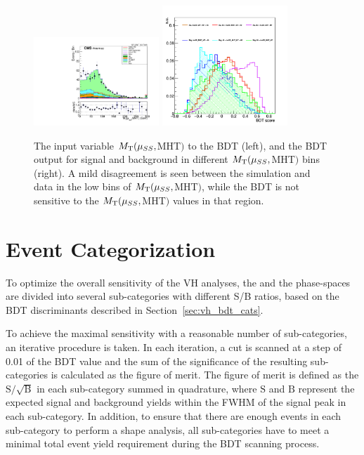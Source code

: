 \begin{figure}[!htb]
  \centering
  \captionsetup{justification=justified}
  \includegraphics[width=0.42\textwidth]{pics/VH_sec/valid_BDT_WH/muSS_MHT_MT.pdf}
  \includegraphics[width=0.42\textwidth]{pics/VH_sec/valid_BDT_WH/check_MT_plot.png}
  \caption{The input variable $M_{\mathrm{T}}(\mu_{SS}, $MHT$)$ to the \WH BDT (left), 
           and the BDT output for signal and background in different $M_{\mathrm{T}}(\mu_{SS}, $MHT$)$ bins (right).
           A mild disagreement is seen between the simulation and data in the low bins of $M_{\mathrm{T}}(\mu_{SS}, $MHT$)$,
           while the BDT is not sensitive to the $M_{\mathrm{T}}(\mu_{SS}, $MHT$)$ values in that region.}
  \label{fig:wh_MT_check}
\end{figure}

\clearpage
\section{Event Categorization}\label{sec:vh_event_cats}

To optimize the overall sensitivity of the VH analyses, 
the \WH and the \ZH phase-spaces are divided into several sub-categories with different S/B ratios, 
based on the BDT discriminants described in Section~\ref{sec:vh_bdt_cats}. 
 
To achieve the maximal sensitivity with a reasonable number of sub-categories, 
an iterative procedure is taken.  
In each iteration, a cut is scanned at a step of 0.01 of the BDT value and the sum of
the significance of the resulting sub-categories is calculated as the figure of merit. 
The figure of merit is defined as the $\mathrm{S}/\sqrt{\mathrm{B}}$ in each sub-category 
summed in quadrature, where $\mathrm{S}$ and $\mathrm{B}$ represent the expected 
signal and background yields within the FWHM of the signal peak in each sub-category.
In addition, to ensure that there are enough events in each sub-category to perform a shape analysis,
all sub-categories have to meet a minimal total event yield requirement during the BDT scanning process.

